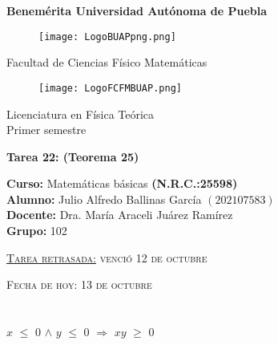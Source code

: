 \documentclass[12pt]{article}
\begin{document}
\pagestyle{empty} 
\setlength{\parindent}{0pt}
\sffamily
\begin{center} \LARGE{\bf Benemérita Universidad Autónoma de Puebla} \\[0.5cm]
\begin{figure}[htb] \centering \texttt{[image: LogoBUAPpng.png]} \end{figure}
\LARGE{Facultad de Ciencias Físico Matemáticas}\\[0.5cm]
\begin{figure}[htb] \centering \texttt{[image: LogoFCFMBUAP.png]} \end{figure} 
\Large{Licenciatura en Física Teórica}\\[0.5cm]
\large{Primer semestre} \end{center}
\begin{center} { \Large \bfseries{Tarea 22}: (Teorema 25)} \\ \end{center}
\large{\bf Curso:} Matemáticas básicas \textbf{(N.R.C.:25598)}\\
\large{\bf Alumno:} Julio Alfredo Ballinas García $\left(202107583\right)$ \\
\large{\bf Docente:} Dra. María Araceli Juárez Ramírez\\
\large{\bf Grupo:} 102\\ \begin{center} 
\vfill
\textsc{\underline{Tarea retrasada:} venció 12 de octubre} \end{center}
\begin{center}
\textsc{Fecha de hoy: 13 de octubre}
\end{center}
\newpage

\section*{} \vspace{.5cm}

{\LARGE{{} \hspace{.1cm} $x$ $\leq$ $0$ $\wedge$ $y$ $\leq$ $0$ $\Longrightarrow$ $xy$ $\geq$ $0$}} \vspace{.5cm}


{}  \vspace{0.5cm}

{} \vspace{0.5cm} 
\end{document}
